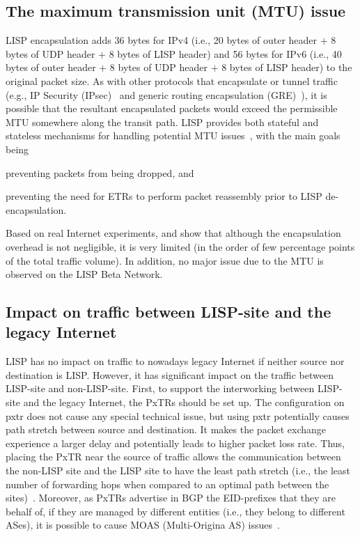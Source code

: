 \subsection{The maximum transmission unit (MTU) issue}
\label{subsubsec:impact_mtu}
LISP encapsulation adds 36 bytes for IPv4 (i.e., 20 bytes of outer header + 8 bytes of UDP header + 8 bytes of LISP header) and 56 bytes for IPv6 (i.e., 40 bytes of outer header + 8 bytes of UDP header + 8 bytes of LISP header) to the original packet size. As with other protocols that encapsulate or tunnel traffic (e.g., IP Security (IPsec)~\cite{thayer1998rfc} and generic routing encapsulation (GRE)~\cite{farinacci2000generic}), it is possible that the resultant encapsulated packets would exceed the permissible MTU somewhere along the transit path. LISP provides both stateful and stateless mechanisms for handling potential MTU issues~\cite{CiscoLISPQA}, with the main goals being 
\begin{enumerate*}[label=(\roman*)]
  \item preventing packets from being dropped, and
  \item preventing the need for ETRs to perform packet reassembly prior to LISP de-encapsulation. 
\end{enumerate*}

Based on real Internet experiments, \cite{lispCacheCost} and \cite{kim2013caching} show that although the encapsulation overhead is not negligible, it is very limited (in the order of few percentage points of the total traffic volume). In addition, no major issue due to the MTU is observed on the LISP Beta Network.

\subsection{Impact on traffic between LISP-site and the legacy Internet}
\label{subsubsec:impact_pxtr}
LISP has no impact on traffic to nowadays legacy Internet if neither source nor destination is LISP. However, it has significant impact on the traffic between LISP-site and non-LISP-site. First, to support the interworking between LISP-site and the legacy Internet, the PxTRs should be set up. The configuration on \acrshort{pxtr} does not cause any special technical issue, but using \acrshort{pxtr} potentially causes path stretch between source and destination. It makes the packet exchange experience a larger delay and potentially leads to higher packet loss rate. Thus, placing the PxTR near the source of traffic allows the communication between the non-LISP site and the LISP site to have the least path stretch (i.e., the least number of forwarding hops when compared to an optimal path between the sites)~\cite{rfc6832}. Moreover, as PxTRs advertise in BGP the EID-prefixes that they are behalf of, if they are managed by different entities (i.e., they belong to different ASes), it is possible to cause MOAS (Multi-Origina AS) issues~\cite{rfc7834}.

